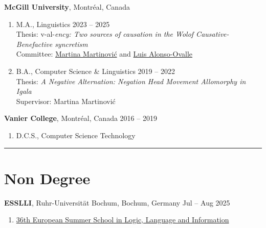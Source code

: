 \documentclass[margin,line]{resume}
\begin{document}
\begin{resume}
	\textbf{McGill University}, Montr\'{e}al, Canada
	\begin{enumerate}[-, leftmargin=1em, topsep=2pt]
		\item[] M.A., %
		      Linguistics%
		      \hfill 2023 -- 2025 \\
			  {\small Thesis: {v}-al-\textit{ency: Two sources of causation in the Wolof Causative-Benefactive syncretism}\\
			  Committee: \href{https://inamartinovic.com/}{Martina Martinović} and \href{https://people.linguistics.mcgill.ca/~luis.alonso-ovalle/}{Luis Alonso-Ovalle}}\vspace{0.2em}
		\item[] B.A., %
		      Computer Science %
		      \& %
		      Linguistics%
		      \hfill 2019 -- 2022\\
			  {\small Thesis: {\it A Negative Alternation: Negation Head Movement Allomorphy in Igala}\\
			  Supervisor: Martina Martinović}
	\end{enumerate}

	\textbf{Vanier College}, Montr\'{e}al, Canada \hfill 2016 -- 2019
	\begin{enumerate}[-, leftmargin=1em, topsep=2pt]
		\item[]  D.C.S., Computer Science Technology
	\end{enumerate}

	\vspace{-1em}\rule{\textwidth}{0.4pt}


	\vspace{-1em}

	\section{\mysidestyle Non Degree}

	\textbf{ESSLLI}, Ruhr-Universität Bochum, Bochum, Germany \hfill Jul -- Aug 2025
	\begin{enumerate}[-, leftmargin=1em, topsep=2pt]
		\item[] \href{https://2025.esslli.eu/}{36th European Summer School in Logic, Language and Information}
	\end{enumerate}


\end{resume}
\end{document}
